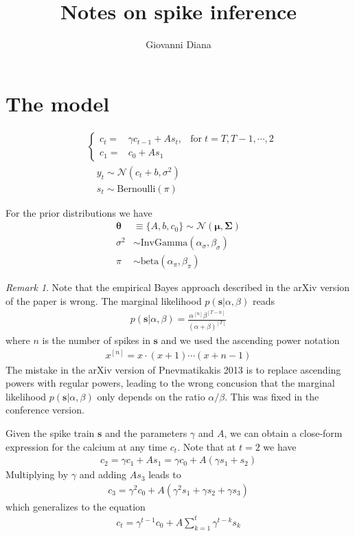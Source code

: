 \documentclass{article}
\author{Giovanni Diana}
\title{Notes on spike inference}
\theoremstyle{remark}
\newtheorem{remark}{Remark}
\begin{document}
\maketitle

\section{The model}
\begin{align}
    &\left\lbrace\begin{array}{clc} 
        c_t =& \gamma c_{t-1} + A s_t,& \mathrm{for}\; t=T,T-1,\cdots,2\\
        c_1 =& c_0 + A s_1 &
    \end{array}\right.\\
    &\quad y_t \sim \mathcal{N}(c_t+b,\sigma^2)\\
    &\quad s_t \sim \mathrm{Bernoulli}(\pi)
\end{align}

For the prior distributions we have
\begin{align}
    \bm{\theta}&\equiv\lbrace A,b,c_0\rbrace \sim \mathcal{N}(\bm{\mu},\bm{\Sigma})\\
    \sigma^2 &\sim \mathrm{InvGamma}(\alpha_\sigma,\beta_\sigma)\\
    \pi&\sim \mathrm{beta}(\alpha_\pi,\beta_\pi)
\end{align}

\begin{tcolorbox}
    \begin{remark}
Note that the empirical Bayes approach described in the arXiv version of the paper is wrong. 
The marginal likelihood $p(\bm{s}|\alpha,\beta)$ reads
\begin{align}
    p(\bm{s}|\alpha,\beta)=\frac{\alpha^{[n]}\beta^{[T-n]}}{(\alpha+\beta)^{[T]}}
\end{align}
where $n$ is the number of spikes in $\bm{s}$ and we used the ascending power notation
\begin{align}
    x^{[n]} = x\cdot (x+1)\cdots (x+n-1)
\end{align}
The mistake in the arXiv version of Pnevmatikakis 2013 is to replace ascending powers with regular powers, leading to the wrong concusion that the marginal likelihood $p(\bm{s}|\alpha,\beta)$ only depends on the ratio $\alpha/\beta$. This was fixed in the conference version.
    \end{remark}
\end{tcolorbox}
Given the spike train $\bm{s}$ and the parameters $\gamma$ and $A$, we can obtain a close-form expression for the calcium at any time $c_t$. 
Note that at $t=2$ we have 
\begin{align}
    c_2=\gamma c_1 +As_1 = \gamma c_0 + A(\gamma s_1 + s_2)
\end{align}
Multiplying by $\gamma$ and adding $A s_3$ leads to
\begin{align}
    c_3=\gamma^2 c_0 + A(\gamma^2 s_1+\gamma s_2 +\gamma s_3)
\end{align}
which generalizes to the equation
\begin{align}
    c_t = \gamma^{t-1}c_0 + A\sum_{k=1}^{t} \gamma^{t-k}s_k
\end{align}
\end{document}
